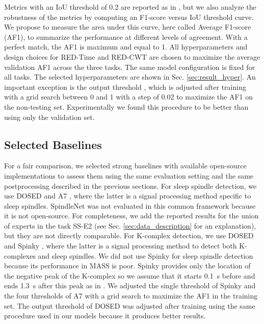 \documentclass[conference]{IEEEtran}
\begin{document}
Metrics with an IoU threshold of 0.2 are reported as in \cite{warby2014sleep}, but we also analyze the robustness of the metrics by computing an F1-score versus IoU threshold curve. We propose to measure the area under this curve, here called Average F1-score (AF1), to summarize the performance at different levels of agreement. With a perfect match, the AF1 is maximum and equal to 1.
All hyperparameters and design choices for RED-Time and RED-CWT are chosen to maximize the average validation AF1 across the three tasks. The same model configuration is fixed for all tasks. The selected hyperparameters are shown in Sec. \ref{sec:result_hyper}. An important exception is the output threshold , which is adjusted after training with a grid search between 0 and 1 with a step of 0.02 to maximize the AF1 on the non-testing set. Experimentally we found this procedure to be better than using only the validation set.

\subsection{Selected Baselines}
\label{sec:baselines}

For a fair comparison, we selected strong baselines with available open-source implementations to assess them using the same evaluation setting and the same postprocessing described in the previous sections. For sleep spindle detection, we use DOSED \cite{chambon2019dosed} and A7 \cite{lacourse2019sleep}, where the latter is a signal processing method specific to sleep spindles. SpindleNet \cite{kulkarni2019deep} was not evaluated in this common framework because it is not open-source. For completeness, we add the reported results for the union of experts in the task SS-E2 (see Sec. \ref{sec:data_description} for an explanation), but they are not directly comparable. For K-complex detection, we use DOSED and Spinky \cite{lajnef2017meet}, where the latter is a signal processing method to detect both K-complexes and sleep spindles. We did not use Spinky for sleep spindle detection because its performance in MASS is poor. Spinky provides only the location of the negative peak of the K-complex so we assume that it starts 0.1~s before and ends 1.3~s after this peak as in \cite{lajnef2017meet}. We adjusted the single threshold of Spinky and the four thresholds of A7 with a grid search to maximize the AF1 in the training set. The output threshold of DOSED was adjusted after training using the same procedure used in our models because it produces better results.
\end{document}

